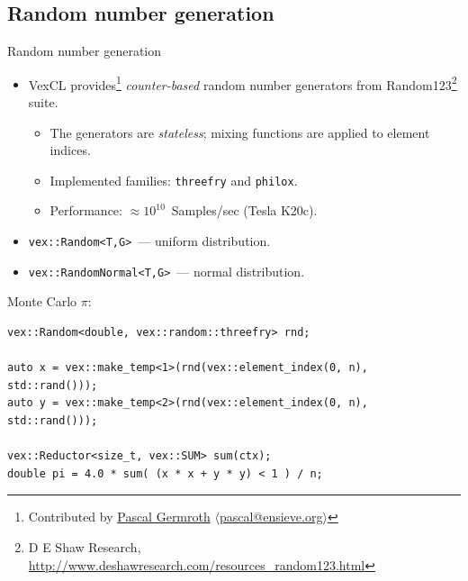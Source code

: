 \documentclass[@BEAMER_OPTIONS@]{beamer}
\newcommand{\code}[1]{\lstinline|#1|}
\begin{document}
\note{ }

\subsection{Random number generation}

\begin{frame}[fragile]{Random number generation}
    \begin{itemize}
        \item VexCL provides\footnote{Contributed by
            \href{https://github.com/neapel}{Pascal Germroth}
            $\langle$\href{mailto:pascal@ensieve.org}{pascal@ensieve.org}$\rangle$}
            \emph{counter-based} random number generators from
            Random123\footnote{D E Shaw Research,
                \href{http://www.deshawresearch.com/resources\_random123.html}{http://www.deshawresearch.com/resources\_random123.html}}
            suite.
            \vspace{-0.5\baselineskip}
            \begin{itemize}
                \item The generators are \emph{stateless}; mixing functions are
                    applied to element indices.
                \item Implemented families: \code{threefry} and \code{philox}.
                \item Performance: $\approx 10^{10}$~Samples/sec (Tesla
                    K20c).
            \end{itemize}
        \item \code{vex::Random<T,G>}~--- uniform distribution.
        \item \code{vex::RandomNormal<T,G>}~--- normal distribution.
    \end{itemize}
    \vspace{-0.5\baselineskip}
    \begin{exampleblock}{Monte Carlo $\pi$:}
        \begin{lstlisting}
vex::Random<double, vex::random::threefry> rnd;

auto x = vex::make_temp<1>(rnd(vex::element_index(0, n), std::rand()));
auto y = vex::make_temp<2>(rnd(vex::element_index(0, n), std::rand()));

vex::Reductor<size_t, vex::SUM> sum(ctx);
double pi = 4.0 * sum( (x * x + y * y) < 1 ) / n;
        \end{lstlisting}
    \end{exampleblock}
\end{frame}
\end{document}
